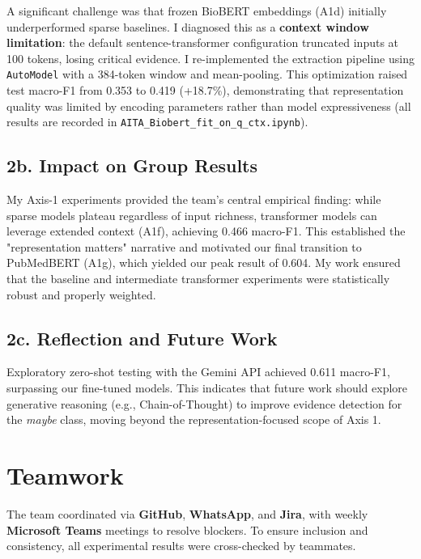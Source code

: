 \documentclass[11pt,a4paper,twocolumn]{article}
\begin{document}
A significant challenge was that frozen BioBERT embeddings (A1d) initially underperformed sparse baselines. I diagnosed this as a \textbf{context window limitation}: the default sentence-transformer configuration truncated inputs at 100 tokens, losing critical evidence. I re-implemented the extraction pipeline using \texttt{AutoModel} with a 384-token window and mean-pooling. This optimization raised test macro-F1 from 0.353 to 0.419 (+18.7\%), demonstrating that representation quality was limited by encoding parameters rather than model expressiveness (all results are recorded in \texttt{AITA\_Biobert\_fit\_on\_q\_ctx.ipynb}).

\subsection*{2b. Impact on Group Results}

My Axis-1 experiments provided the team's central empirical finding: while sparse models plateau regardless of input richness, transformer models can leverage extended context (A1f), achieving 0.466 macro-F1. This established the "representation matters" narrative and motivated our final transition to PubMedBERT (A1g), which yielded our peak result of 0.604. My work ensured that the baseline and intermediate transformer experiments were statistically robust and properly weighted.

\subsection*{2c. Reflection and Future Work}

Exploratory zero-shot testing with the Gemini API achieved 0.611 macro-F1, surpassing our fine-tuned models. This indicates that future work should explore generative reasoning (e.g., Chain-of-Thought) to improve evidence detection for the \emph{maybe} class, moving beyond the representation-focused scope of Axis 1.


\section{Teamwork}


The team coordinated via \textbf{GitHub}, \textbf{WhatsApp}, and \textbf{Jira}, with weekly \textbf{Microsoft Teams} meetings to resolve blockers. To ensure inclusion and consistency, all experimental results were cross-checked by teammates.
\end{document}

